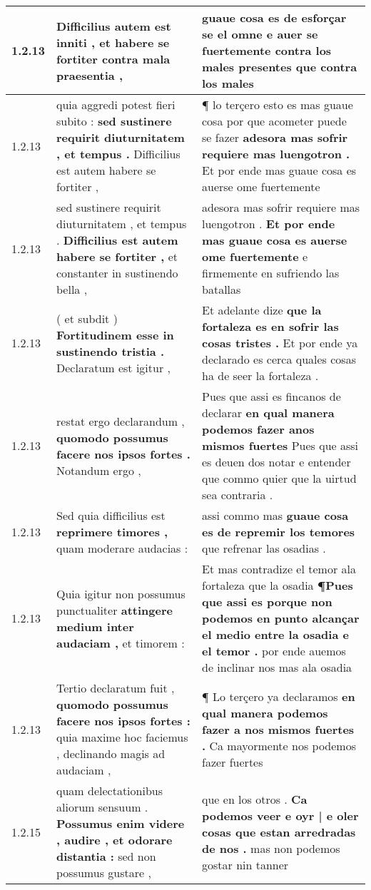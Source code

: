 \begin{tabular}{|p{1cm}|p{6.5cm}|p{6.5cm}|}
1.2.13 & Difficilius autem est inniti , \textbf{ et habere se fortiter } contra mala praesentia , & guaue cosa es de esforçar se el omne \textbf{ e auer se fuertemente contra los males presentes } que contra los males \\\hline
1.2.13 & quia aggredi potest fieri subito : \textbf{ sed sustinere requirit diuturnitatem , et tempus . } Difficilius est autem habere se fortiter , & ¶ lo terçero esto es mas guaue cosa por que acometer puede se fazer \textbf{ adesora mas sofrir requiere mas luengotron . } Et por ende mas guaue cosa es auerse ome fuertemente \\\hline
1.2.13 & sed sustinere requirit diuturnitatem , et tempus . \textbf{ Difficilius est autem habere se fortiter , } et constanter in sustinendo bella , & adesora mas sofrir requiere mas luengotron . \textbf{ Et por ende mas guaue cosa es auerse ome fuertemente } e firmemente en sufriendo las batallas \\\hline
1.2.13 & ( et subdit ) \textbf{ Fortitudinem esse in sustinendo tristia . } Declaratum est igitur , & Et adelante dize \textbf{ que la fortaleza es en sofrir las cosas tristes . } Et por ende ya declarado es cerca quales cosas ha de seer la fortaleza . \\\hline
1.2.13 & restat ergo declarandum , \textbf{ quomodo possumus facere nos ipsos fortes . } Notandum ergo , & Pues que assi es fincanos de declarar \textbf{ en qual manera podemos fazer anos mismos fuertes } Pues que assi es deuen dos notar e entender que commo quier que la uirtud sea contraria . \\\hline
1.2.13 & Sed quia difficilius est \textbf{ reprimere timores , } quam moderare audacias : & assi commo mas \textbf{ guaue cosa es de repremir los temores } que refrenar las osadias . \\\hline
1.2.13 & Quia igitur non possumus punctualiter \textbf{ attingere medium inter audaciam , } et timorem : & Et mas contradize el temor ala fortaleza que la osadia \textbf{ ¶Pues que assi es porque non podemos en punto alcançar el medio entre la osadia e el temor . } por ende auemos de inclinar nos mas ala osadia \\\hline
1.2.13 & Tertio declaratum fuit , \textbf{ quomodo possumus facere nos ipsos fortes : } quia maxime hoc faciemus , declinando magis ad audaciam , & ¶ Lo terçero ya declaramos \textbf{ en qual manera podemos fazer a nos mismos fuertes . } Ca mayormente nos podemos fazer fuertes \\\hline
1.2.15 & quam delectationibus aliorum sensuum . \textbf{ Possumus enim videre , audire , et odorare distantia : } sed non possumus gustare , & que en los otros . \textbf{ Ca podemos veer e oyr | e oler cosas que estan arredradas de nos . } mas non podemos gostar nin tanner \\\hline

\end{tabular}

